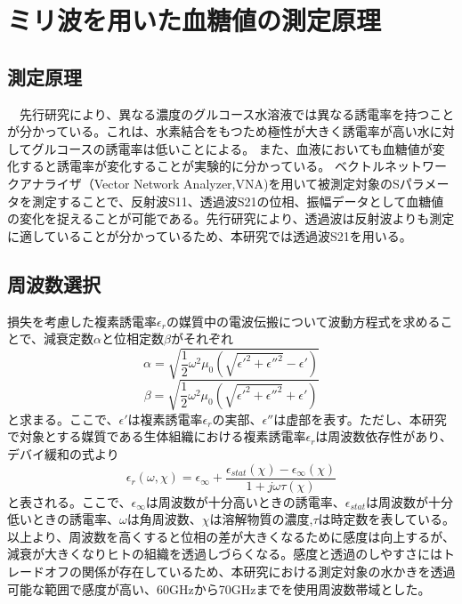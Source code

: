\documentclass[11pt,a4paper,uplatex,draft]{ujarticle}
\begin{document}
\section{ミリ波を用いた血糖値の測定原理}

\subsection{測定原理}
　先行研究\cite{Nikawa}により、異なる濃度のグルコース水溶液では異なる誘電率を持つことが分かっている。これは、水素結合をもつため極性が大きく誘電率が高い水に対してグルコースの誘電率は低いことによる。
また、血液においても血糖値が変化すると誘電率が変化することが実験的に分かっている\cite{Cole-cole}\cite{FREER}。
ベクトルネットワークアナライザ（Vector Network Analyzer,VNA)を用いて被測定対象のSパラメータを測定することで、反射波S11、透過波S21の位相、振幅データとして血糖値の変化を捉えることが可能である。先行研究\cite{trans}により、透過波は反射波よりも測定に適していることが分かっているため、本研究では透過波S21を用いる。

\newpage
\subsection{周波数選択}
損失を考慮した複素誘電率$\epsilon_r$の媒質中の電波伝搬について波動方程式を求めることで、減衰定数$\alpha$と位相定数$\beta$がそれぞれ
\begin{equation}
   \alpha = \sqrt{\frac{1}{2}\omega^2\mu_0(\sqrt{\epsilon'^2+\epsilon''^2}-\epsilon')}
\end{equation}
\begin{equation}
   \beta =  \sqrt{\frac{1}{2}\omega^2\mu_0(\sqrt{\epsilon'^2+\epsilon''^2}+\epsilon')}
\end{equation}
と求まる。ここで、$\epsilon'$は複素誘電率$\epsilon_r$の実部、$\epsilon''$は虚部を表す。ただし、本研究で対象とする媒質である生体組織における複素誘電率$\epsilon_r$は周波数依存性があり、デバイ緩和の式より
\begin{equation}
   \epsilon_r(\omega,\chi) =  \epsilon_{\infty} + \frac{\epsilon_{stat}(\chi)-\epsilon_{\infty}(\chi)}{1 + j\omega\tau(\chi)}
\end{equation}
と表される。ここで、$\epsilon_{\infty}$は周波数が十分高いときの誘電率、$\epsilon_{stat}$は周波数が十分低いときの誘電率、$\omega$は角周波数、$\chi$は溶解物質の濃度,$\tau$は時定数を表している。
以上より、周波数を高くすると位相の差が大きくなるために感度は向上するが、減衰が大きくなりヒトの組織を透過しづらくなる。感度と透過のしやすさにはトレードオフの関係が存在しているため、本研究における測定対象の水かきを透過可能な範囲で感度が高い、60GHzから70GHzまでを使用周波数帯域とした。
\end{document}
